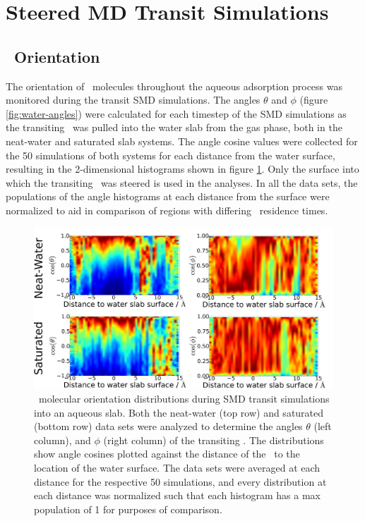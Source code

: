 \section{Steered MD Transit Simulations}

\subsection {\suldiox~Orientation}

	The orientation of \suldiox~molecules throughout the aqueous adsorption process was monitored during the transit SMD simulations. The angles $\theta$ and $\phi$ (figure \ref{fig:water-angles}) were calculated for each timestep of the SMD simulations as the transiting \suldiox~was pulled into the water slab from the gas phase, both in the neat-water and saturated slab systems. The angle cosine values were collected for the 50 simulations of both systems for each distance from the water surface, resulting in the 2-dimensional histograms shown in figure \ref{fig:so2-transit-angles}. Only the surface into which the transiting \suldiox~was steered is used in the analyses. In all the data sets, the populations of the angle histograms at each distance from the surface were normalized to aid in comparison of regions with differing \suldiox~residence times.

\begin{figure}[h!]
	\begin{center}
		\includegraphics[scale=1.0]{images/transit-so2-angles/so2-angles-transit.png}
		\caption{\suldiox~molecular orientation distributions during SMD transit simulations into an aqueous slab. Both the neat-water (top row) and saturated (bottom row) data sets were analyzed to determine the angles $\theta$ (left column), and $\phi$ (right column) of the transiting \suldiox. The distributions show angle cosines plotted against the distance of the \suldiox~to the location of the water surface. The data sets were averaged at each distance for the respective 50 simulations, and every distribution at each distance was normalized such that each histogram has a max population of 1 for purposes of comparison.}
		\label{fig:so2-transit-angles}
	\end{center}
\end{figure}

